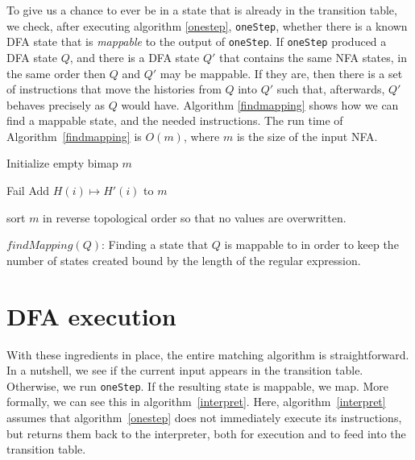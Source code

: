 \documentclass[11pt]{Thesis}
\theoremstyle{definition}
\begin{document}
To give us a chance to ever be in a state that is already in the
transition table, we check, after executing algorithm \ref{onestep},
\texttt{oneStep}, whether there is a known DFA state that is
\emph{mappable} to the output of \texttt{oneStep}.  If \texttt{oneStep}
produced a DFA state $Q$, and there is a DFA state $Q'$ that contains
the same NFA states, in the same order then $Q$ and $Q'$ may be
mappable.  If they are, then there is a set of instructions that
move the histories from $Q$ into $Q'$ such that, afterwards, $Q'$
behaves precisely as $Q$ would have. Algorithm \ref{findmapping}
shows how we can find a mappable state, and the needed instructions.
The run time of Algorithm~\ref{findmapping} is $O(m)$, where $m$
is the size of the input NFA.

\begin{algorithm*}[htpb]
\begin{algorithmic}[1]
    

	\State Initialize empty bimap $m$ 
	
    
			
				\State Fail
			\Else
				\State Add $H(i) \mapsto H'(i)$ to $m$
			\EndIf
		\EndFor
    \EndFor
\EndFor
{}
  
	\State sort $m$ in reverse topological order so that no values are overwritten.
  
\caption{\label{findmapping}$findMapping(Q)$: Finding a state that $Q$ is
mappable to in order to keep the number of states created bound by the length
of the regular expression.}
\end{algorithmic}
\end{algorithm*}

\section{DFA execution}
With these ingredients in place, the entire matching algorithm is
straightforward.  In a nutshell, we see if the current input appears
in the transition table. Otherwise, we run \texttt{oneStep}. If the
resulting state is mappable, we map.  More formally, we can see
this in algorithm~\ref{interpret}. Here, algorithm~\ref{interpret} 
assumes that algorithm~\ref{onestep} does not immediately execute 
its instructions, but returns them back to the interpreter, both for 
execution and to feed into the transition table.
\end{document}
